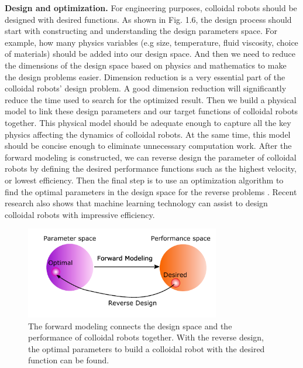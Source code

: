 \textbf{Design and optimization.} For engineering purposes, colloidal robots should be designed with desired functions\autocite{liebchen2019optimal}. As shown in Fig. 1.6, the design process should start with constructing and understanding the design parameters space. For example, how many physics variables (e.g size, temperature, fluid viscosity, choice of materials) should be added into our design space. And then we  need to reduce the dimensions of the design space based on physics and mathematics to make the design problems easier. Dimension reduction is a very essential part of the colloidal robots' design problem. A good dimension reduction will significantly reduce the time used to search for the optimized result. Then we build a physical model to link these design parameters and our target functions of colloidal robots together. This physical model should be adequate enough  to capture all the key physics affecting the dynamics of colloidal robots. At the same time, this model should be concise enough to eliminate unnecessary computation work. After the forward modeling is constructed, we can reverse design the parameter of colloidal robots by defining the desired performance functions such as the highest velocity, or lowest efficiency. Then the final step is to use an optimization algorithm to find the optimal parameters in the design space for the reverse problems \autocite{ward1963hierarchical,nocedal2006numerical}. Recent research also shows that machine learning technology can assist to design colloidal robots with impressive efficiency\autocite{yang2020micro,yang2020cargo,yang2019deep,tsang2018self}.
\begin{figure}
\centering
\includegraphics[width=8.5cm]{figures/1_6.pdf}
\caption{The forward modeling connects the design space and the performance of colloidal robots together. With the reverse design, the optimal parameters to build a colloidal robot with the desired function can be found.}
\label{fig:1.6}
\end{figure}


